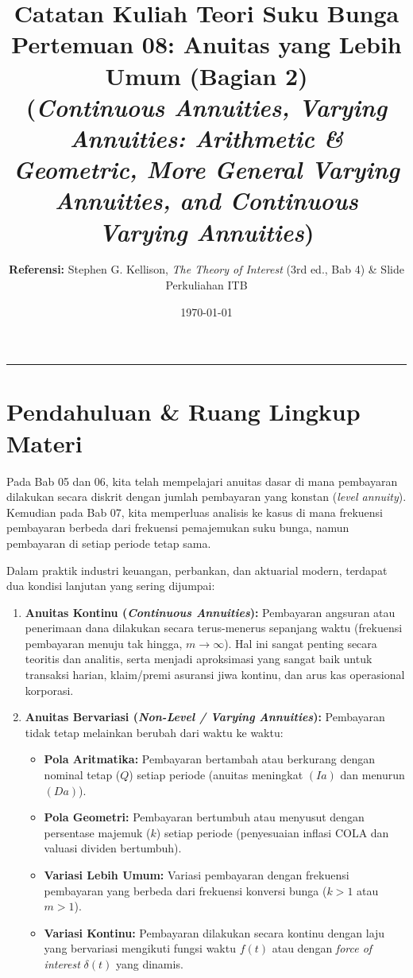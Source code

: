 \documentclass[11pt,a4paper]{article}
\title{\textbf{\LARGE Catatan Kuliah Teori Suku Bunga}\\[0.3em]
\Large Pertemuan 08: Anuitas yang Lebih Umum (Bagian 2)\\
\large (\textit{Continuous Annuities, Varying Annuities: Arithmetic \& Geometric, More General Varying Annuities, and Continuous Varying Annuities})}
\author{\textbf{Referensi:} Stephen G. Kellison, \textit{The Theory of Interest} (3rd ed., Bab 4) \& Slide Perkuliahan ITB}
\date{\today}
\begin{document}
\maketitle
\tableofcontents
\vspace{1em}
\noindent\rule{\textwidth}{0.4pt}
\vspace{1.5em}

\section{Pendahuluan \& Ruang Lingkup Materi}

Pada Bab 05 dan 06, kita telah mempelajari anuitas dasar di mana pembayaran dilakukan secara diskrit dengan jumlah pembayaran yang konstan (\textit{level annuity}). Kemudian pada Bab 07, kita memperluas analisis ke kasus di mana frekuensi pembayaran berbeda dari frekuensi pemajemukan suku bunga, namun pembayaran di setiap periode tetap sama.

Dalam praktik industri keuangan, perbankan, dan aktuarial modern, terdapat dua kondisi lanjutan yang sering dijumpai:
\begin{enumerate}[label=\textbf{\arabic*.}]
    \item \textbf{Anuitas Kontinu (\textit{Continuous Annuities}):} Pembayaran angsuran atau penerimaan dana dilakukan secara terus-menerus sepanjang waktu (frekuensi pembayaran menuju tak hingga, $m \to \infty$). Hal ini sangat penting secara teoritis dan analitis, serta menjadi aproksimasi yang sangat baik untuk transaksi harian, klaim/premi asuransi jiwa kontinu, dan arus kas operasional korporasi.
    \item \textbf{Anuitas Bervariasi (\textit{Non-Level / Varying Annuities}):} Pembayaran tidak tetap melainkan berubah dari waktu ke waktu:
    \begin{itemize}
        \item \textbf{Pola Aritmatika:} Pembayaran bertambah atau berkurang dengan nominal tetap ($Q$) setiap periode (anuitas meningkat $(Ia)$ dan menurun $(Da)$).
        \item \textbf{Pola Geometri:} Pembayaran bertumbuh atau menyusut dengan persentase majemuk ($k$) setiap periode (penyesuaian inflasi COLA dan valuasi dividen bertumbuh).
        \item \textbf{Variasi Lebih Umum:} Variasi pembayaran dengan frekuensi pembayaran yang berbeda dari frekuensi konversi bunga ($k > 1$ atau $m > 1$).
        \item \textbf{Variasi Kontinu:} Pembayaran dilakukan secara kontinu dengan laju yang bervariasi mengikuti fungsi waktu $f(t)$ atau dengan \textit{force of interest} $\delta(t)$ yang dinamis.
    \end{itemize}
\end{enumerate}
\end{document}
